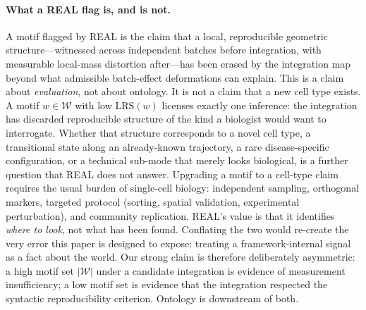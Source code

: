 
\paragraph*{What a REAL flag is, and is not.}
A motif flagged by REAL is the claim that a local, reproducible geometric structure---witnessed across independent batches before integration, with measurable local-mass distortion after---has been erased by the integration map beyond what admissible batch-effect deformations can explain. This is a claim about \emph{evaluation}, not about ontology. It is not a claim that a new cell type exists. A motif $w \in \mathcal{W}$ with low $\mathrm{LRS}(w)$ licenses exactly one inference: the integration has discarded reproducible structure of the kind a biologist would want to interrogate. Whether that structure corresponds to a novel cell type, a transitional state along an already-known trajectory, a rare disease-specific configuration, or a technical sub-mode that merely looks biological, is a further question that REAL does not answer. Upgrading a motif to a cell-type claim requires the usual burden of single-cell biology: independent sampling, orthogonal markers, targeted protocol (sorting, spatial validation, experimental perturbation), and community replication. REAL's value is that it identifies \emph{where to look}, not what has been found. Conflating the two would re-create the very error this paper is designed to expose: treating a framework-internal signal as a fact about the world. Our strong claim is therefore deliberately asymmetric: a high motif set $|\mathcal{W}|$ under a candidate integration is evidence of measurement insufficiency; a low motif set is evidence that the integration respected the syntactic reproducibility criterion. Ontology is downstream of both.
